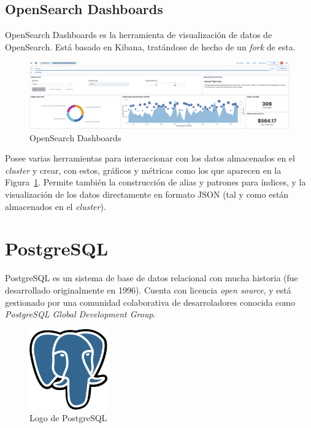 \subsection{OpenSearch Dashboards}

OpenSearch Dashboards es la herramienta de visualización de datos de OpenSearch. Está basado en Kibana, tratándose de hecho de un \emph{fork} de esta. \emph{\parencite{Reference18}}

\begin{figure}[ht]
    \centering
    \includegraphics[width=\textwidth]{Figures/opensearch-dashboards}
    \decoRule
    \caption[OpenSearch Dashboards]{OpenSearch Dashboards \emph{\parencite{Reference18}}}
    \label{fig:opensearch-dashboards}
\end{figure}

Posee varias herramientas para interaccionar con los datos almacenados en el \emph{cluster} y crear, con estos, gráficos y métricas como los que aparecen en la Figura~\ref{fig:opensearch-dashboards}. Permite también la construcción de alias y patrones para índices, y la visualización de los datos directamente en formato JSON (tal y como están almacenados en el \emph{cluster}).


\section{PostgreSQL}

PostgreSQL es un sistema de base de datos relacional con mucha historia (fue desarrollado originalmente en 1996). Cuenta con licencia \emph{open source}, y está gestionado por una comunidad colaborativa de desarroladores conocida como \emph{PostgreSQL Global Development Group}. \emph{\parencite{Reference19}}

\begin{figure}[ht]
    \centering
    \includegraphics[width=0.3\textwidth]{Figures/postgresql-logo}
    \decoRule
    \caption[PostgreSQL (Logo)]{Logo de PostgreSQL \emph{\parencite{Reference19}}}
    \label{fig:postgresql-logo}
\end{figure}

